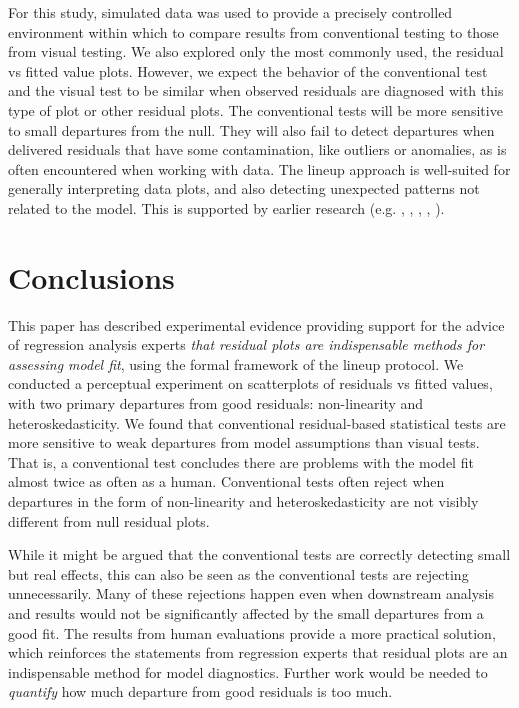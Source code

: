 \documentclass[]{interact}
\theoremstyle{plain}%
\theoremstyle{definition}
\theoremstyle{remark}
\begin{document}
For this study, simulated data was used to provide a precisely
controlled environment within which to compare results from conventional
testing to those from visual testing. We also explored only the most
commonly used, the residual vs fitted value plots. However, we expect
the behavior of the conventional test and the visual test to be similar
when observed residuals are diagnosed with this type of plot or other
residual plots. The conventional tests will be more sensitive to small
departures from the null. They will also fail to detect departures when
delivered residuals that have some contamination, like outliers or
anomalies, as is often encountered when working with data. The lineup
approach is well-suited for generally interpreting data plots, and also
detecting unexpected patterns not related to the model. This is
supported by earlier research (e.g. \citet{wickham2010},
\citet{roy2015using}, \citet{loy2015you}, \citet{VanderPlas2015},
\citet{loy2016variations}).

\hypertarget{conclusions}{%
\section{Conclusions}\label{conclusions}}

This paper has described experimental evidence providing support for the
advice of regression analysis experts \emph{that residual plots are
indispensable methods for assessing model fit}, using the formal
framework of the lineup protocol. We conducted a perceptual experiment
on scatterplots of residuals vs fitted values, with two primary
departures from good residuals: non-linearity and heteroskedasticity. We
found that conventional residual-based statistical tests are more
sensitive to weak departures from model assumptions than visual tests.
That is, a conventional test concludes there are problems with the model
fit almost twice as often as a human. Conventional tests often reject
when departures in the form of non-linearity and heteroskedasticity are
not visibly different from null residual plots.

While it might be argued that the conventional tests are correctly
detecting small but real effects, this can also be seen as the
conventional tests are rejecting unnecessarily. Many of these rejections
happen even when downstream analysis and results would not be
significantly affected by the small departures from a good fit. The
results from human evaluations provide a more practical solution, which
reinforces the statements from regression experts that residual plots
are an indispensable method for model diagnostics. Further work would be
needed to \emph{quantify} how much departure from good residuals is too
much.
\end{document}
